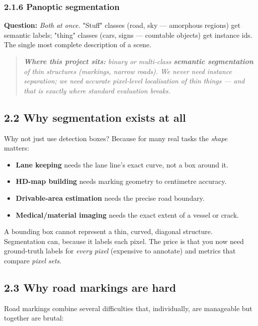 \documentclass[11pt]{article}
\begin{document}
\subsubsection*{2.1.6 Panoptic segmentation}
\textbf{Question:} \textit{Both at once.} "Stuff" classes (road, sky --- amorphous regions) get semantic labels; "thing" classes (cars, signs --- countable objects) get instance ids. The single most complete description of a scene.

\begin{quote}\itshape \textbf{Where this project sits:} binary or multi-class \textbf{semantic segmentation} of thin structures (markings, narrow roads). We never need instance separation; we need \textit{accurate pixel-level localisation of thin things} --- and that is exactly where standard evaluation breaks.\end{quote}

\subsection*{2.2 Why segmentation exists at all}

Why not just use detection boxes? Because for many real tasks the \textit{shape} matters:

\begin{itemize}\setlength{\itemsep}{1pt}
\item \textbf{Lane keeping} needs the lane line's exact curve, not a box around it.
\item \textbf{HD-map building} needs marking geometry to centimetre accuracy.
\item \textbf{Drivable-area estimation} needs the precise road boundary.
\item \textbf{Medical/material imaging} needs the exact extent of a vessel or crack.
\end{itemize}

A bounding box cannot represent a thin, curved, diagonal structure. Segmentation can, because it labels each pixel. The price is that you now need ground-truth labels for \textit{every pixel} (expensive to annotate) and metrics that compare \textit{pixel sets}.

\subsection*{2.3 Why road markings are hard}

Road markings combine several difficulties that, individually, are manageable but together are brutal:
\end{document}
